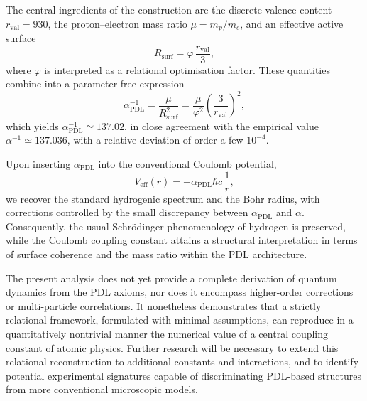 \documentclass[12pt,a4paper]{article}
\begin{document}
The central ingredients of the construction are the discrete valence content \(r_{\text{val}}=930\), the proton–electron mass ratio \(\mu=m_p/m_e\), and an effective active surface
\[
  R_{\text{surf}} = \varphi\,\frac{r_{\text{val}}}{3},
\]
where \(\varphi\) is interpreted as a relational optimisation factor.
These quantities combine into a parameter-free expression
\[
  \alpha_{\text{PDL}}^{-1}
  =
  \frac{\mu}{R_{\text{surf}}^2}
  =
  \frac{\mu}{\varphi^2}\left(\frac{3}{r_{\text{val}}}\right)^2,
\]
which yields \(\alpha_{\text{PDL}}^{-1}\simeq 137.02\), in close agreement with the empirical value \(\alpha^{-1}\simeq 137.036\), with a relative deviation of order a few \(10^{-4}\).\cite{Laubscher2026PDL_English,Laubscher2026LDP_French}

Upon inserting \(\alpha_{\text{PDL}}\) into the conventional Coulomb potential,
\[
  V_{\text{eff}}(r) = -\alpha_{\text{PDL}}\hbar c\,\frac{1}{r},
\]
we recover the standard hydrogenic spectrum and the Bohr radius, with corrections controlled by the small discrepancy between \(\alpha_{\text{PDL}}\) and \(\alpha\).
Consequently, the usual Schr\"odinger phenomenology of hydrogen is preserved, while the Coulomb coupling constant attains a structural interpretation in terms of surface coherence and the mass ratio within the PDL architecture.\cite{Laubscher2026PDL_English,Laubscher2026LDP_French}

The present analysis does not yet provide a complete derivation of quantum dynamics from the PDL axioms, nor does it encompass higher-order corrections or multi-particle correlations.
It nonetheless demonstrates that a strictly relational framework, formulated with minimal assumptions, can reproduce in a quantitatively nontrivial manner the numerical value of a central coupling constant of atomic physics.
Further research will be necessary to extend this relational reconstruction to additional constants and interactions, and to identify potential experimental signatures capable of discriminating PDL-based structures from more conventional microscopic models.\cite{Laubscher2026IntroPDL,Laubscher2026PDL_English}


\end{document}
